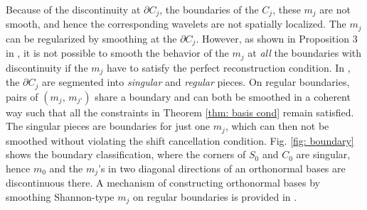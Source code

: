 Because of the discontinuity at $\partial C_j$, the boundaries of the $C_j$, these $m_j$ are not smooth, and hence the corresponding wavelets are not spatially localized. The $m_j$ can be regularized by smoothing at the $\partial C_j$.
However, as shown in Proposition 3 in \cite{durand2007}, it is not possible to smooth the behavior of the $m_j$ at  {\it all} the boundaries with discontinuity if the $m_j$ have to satisfy the perfect reconstruction condition.
In \cite{yin2014orthshear}, the $\partial C_j$ are segmented into {\it singular} and {\it regular} pieces. On regular boundaries, pairs of $(m_j,\, m_{j'})$ share a boundary and can both be smoothed in a coherent way such that all the constraints in Theorem \ref{thm: basis cond} remain satisfied. The singular pieces are boundaries for just one $m_j$, which can then not be smoothed without violating the shift cancellation condition. Fig. \ref{fig: boundary} shows the boundary classification, where the corners of $S_0$ and $C_0$ are singular, hence $m_0$ and the $m_j$'s in two diagonal directions of an orthonormal bases are discontinuous there. A mechanism of constructing orthonormal bases by smoothing Shannon-type $m_j$ on regular boundaries is provided in \cite{yin2014orthshear}.%



